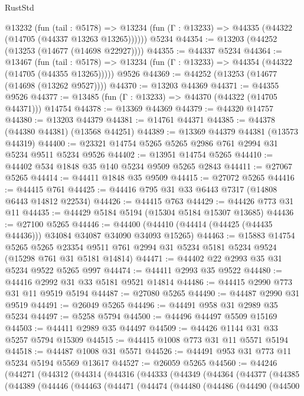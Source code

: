 \begin{lexlean}{RustStd}
\begin{coremodule}
    @13232
      (fun (tail : @5178) =>
      @13234 (fun (Γ : @13233) => @44335 (@44322 (@14705 (@44337 @13263 @13265))))))
    @5234
@44354 := @13203 (@44252 (@13253 (@14677 (@14698 @22927))))
@44355 := @44337 @5234
@44364 := @13467
    (fun (tail : @5178) => @13234 (fun (Γ : @13233) => @44354 (@44322 (@14705 (@44355 @13265)))))
    @9526
@44369 := @44252 (@13253 (@14677 (@14698 (@13262 @9527))))
@44370 := @13203 @44369
@44371 := @44355 @9526
@44377 := @13485 (fun (Γ : @13233) => @44370 (@44322 (@14705 @44371))) @14754
@44378 := @13369 @44369
@44379 := @44320 @14757
@44380 := @13203 @44379
@44381 := @14761 @44371
@44385 := @44378 (@44380 @44381) (@13568 @44251)
@44389 := @13369 @44379 @44381 (@13573 @44319)
@44400 := @23321 @14754 @5265 @5265 @2986 @761 @2994 @31 @5234 @9511 @5234 @9526
@44402 := @13951 @14754 @5265
@44410 := @44402 @534 @1848 @35 @140 @5234 @9509 @5265 @2843
@44411 := @27067 @5265
@44414 := @44411 @1848 @35 @9509
@44415 := @27072 @5265
@44416 := @44415 @761
@44425 := @44416 @795 @31 @33 @6443 @7317 (@14808 @6443 @14812 @22534)
@44426 := @44415 @763
@44429 := @44426 @773 @31 @11
@44435 := @44429 @5184 @5194 (@15304 @5184 @15307 @13685)
@44436 := @27100 @5265
@44446 := @44400 (@44410 (@44414 (@44425 (@44435 @44436))) @34084 @34087 @34090 @34093 @15265)
@44463 := @15883
    @14754
    @5265
    @5265
    @23354
    @9511
    @761
    @2994
    @31
    @5234
    @5181
    @5234
    @9524
    (@15298 @761 @31 @5181 @14814)
@44471 := @44402 @22 @2993 @35 @31 @5234 @9522 @5265 @997
@44474 := @44411 @2993 @35 @9522
@44480 := @44416 @2992 @31 @33 @5181 @9521 @14814
@44486 := @44415 @2990 @773 @31 @11 @9519 @5194
@44487 := @27080 @5265
@44490 := @44487 @2990 @31 @9519
@44491 := @26049 @5265
@44496 := @44491 @958 @31 @2989 @35 @5234
@44497 := @5258 @5794
@44500 := @44496 @44497 @5509 @15169
@44503 := @44411 @2989 @35 @44497
@44509 := @44426 @1144 @31 @33 @5257 @5794 @15309
@44515 := @44415 @1008 @773 @31 @11 @5571 @5194
@44518 := @44487 @1008 @31 @5571
@44526 := @44491 @953 @31 @773 @11 @5234 @5194 @5569 @13617
@44527 := @26059 @5265
@44560 := @44246
    (@44271
      (@44312
        (@44314
          (@44316
            (@44333
              (@44349
                (@44364
                  (@44377
                    (@44385
                      (@44389
                        (@44446
                          (@44463
                            (@44471
                              (@44474
                                (@44480
                                  (@44486
                                    (@44490
                                      (@44500

\end{coremodule}
\end{lexlean}
